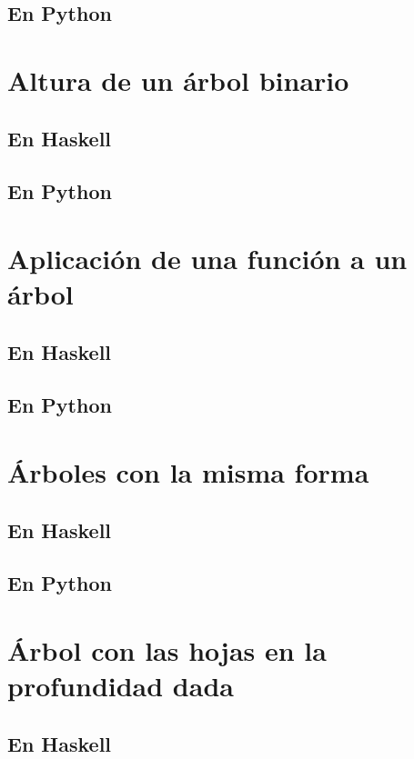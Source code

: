 \documentclass[a4paper,12pt,twoside]{book}
\begin{document}
\subsection*{En Python}

\section{Altura de un árbol binario}
\subsection*{En Haskell}
\subsection*{En Python}

\section{Aplicación de una función a un árbol}
\subsection*{En Haskell}
\subsection*{En Python}

\section{Árboles con la misma forma}
\subsection*{En Haskell}
\subsection*{En Python}

\section{Árbol con las hojas en la profundidad dada}
\subsection*{En Haskell}
\end{document}
